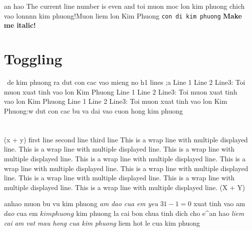 \begin{num vu kim phuong}
an hao The current line number is even and toi muon moc lon kim phuong
chich vao lonnnn kim phuong!\beta Muon liem lon Kim Phuong
\texttt{con di kim phuong}
\texttt{}
	\textbf{Make me italic!}
\section*{Toggling}
$\frac{}{}$
de kim phuong ra dut con cac vao mieng no h1
lines
;a
\alpha
Line 1
Line 2
Line3: Toi muon xuat tinh vao lon Kim Phuong
Line 1
Line 2
Line3: Toi muon xuat tinh vao lon Kim Phuong
Line 1
Line 2
Line3: Toi muon xuat tinh vao lon Kim Phuong:w
dut con cac bu va dai vao cuon hong kim phuong
\section{}
\begin{}
(x + y)
first line
second line
third line
This is a wrap line with multiple displayed line. This is a wrap line with multiple displayed line. This is a wrap line with multiple displayed line. This is a wrap line with multiple displayed line. This is a wrap line with multiple displayed line. This is a wrap line with multiple displayed line. This is a wrap line with multiple displayed line. This is a wrap line with multiple displayed line. This is a wrap line with multiple displayed line. 
\left(X + Y\right)
\end{}
anhao
muon bu vu kim phuong
	\textit{am dao cua em yeu}
$ 31 - 1 = 0 $ 
xuat tinh vao am $dao$ cua em $kim phuong$
kim phuong la cai bon chua tinh dich cho e^{an hao}
	\textit{liem cai am vat mau hong cua kim phuong}
{liem hot le cua kim phuong}
\end{num vu kim phuong}
